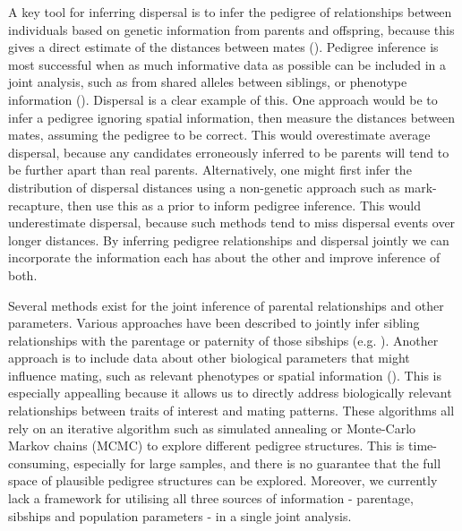 \documentclass[10pt, a4paper, twocolumn]{article} %
\begin{document}
A key tool for inferring dispersal is to infer the pedigree of relationships between individuals based on genetic information from parents and offspring, because this gives a direct estimate of the distances between mates (\cite{adams1992using, cain2000long, austerlitz2004using,pemberton2008wild}).
Pedigree inference is most successful when as much informative data as possible can be included in a joint analysis, such as from shared alleles between siblings, or phenotype information (\cite{neff2001bayesian, wang2007parentage}).
Dispersal is a clear example of this.
One approach would be to infer a pedigree ignoring spatial information, then measure the distances between mates, assuming the pedigree to be correct.
This would overestimate average dispersal, because any candidates erroneously inferred to be parents will tend to be further apart than real parents.
Alternatively, one might first infer the distribution of dispersal distances using a non-genetic approach such as mark-recapture, then use this as a prior to inform pedigree inference.
This would underestimate dispersal, because such methods tend to miss dispersal events over longer distances.
By inferring pedigree relationships and dispersal jointly we can incorporate the information each has about the other and improve inference of both.

Several methods exist for the joint inference of parental relationships and other parameters.
Various approaches have been described to jointly infer sibling relationships with the parentage or paternity of those sibships (e.g. \cite{emery2001assignment, thomas2002sibship, jones2007estimating, wang2004sibship, anderson2016bayesian, huisman2017pedigree}).
Another approach is to include data about other biological parameters that might influence mating, such as relevant phenotypes or spatial information (\cite{neff2001bayesian, hadfield2006towards}).
This is especially appealling because it allows us to directly address biologically relevant relationships between traits of interest and mating patterns.
These algorithms all rely on an iterative algorithm such as simulated annealing or Monte-Carlo Markov chains (MCMC) to explore different pedigree structures.
This is time-consuming, especially for large samples, and there is no guarantee that the full space of plausible pedigree structures can be explored.
Moreover, we currently lack a framework for utilising all three sources of information - parentage, sibships and population parameters - in a single joint analysis.
\end{document}
